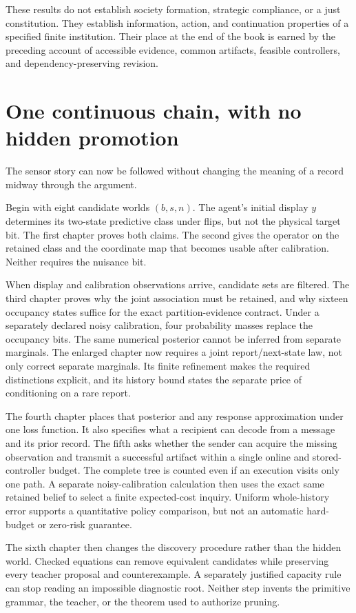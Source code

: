 These results do not establish society formation, strategic compliance, or a just constitution. They establish information, action, and continuation properties of a specified finite institution. Their place at the end of the book is earned by the preceding account of accessible evidence, common artifacts, feasible controllers, and dependency-preserving revision.

\chapter{One continuous chain, with no hidden promotion}\label{ch:close}
The sensor story can now be followed without changing the meaning of a record midway through the argument.

Begin with eight candidate worlds $(b,s,n)$. The agent's initial display $y$ determines its two-state predictive class under flips, but not the physical target bit. The first chapter proves both claims. The second gives the operator on the retained class and the coordinate map that becomes usable after calibration. Neither requires the nuisance bit.

When display and calibration observations arrive, candidate sets are filtered. The third chapter proves why the joint association must be retained, and why sixteen occupancy states suffice for the exact partition-evidence contract. Under a separately declared noisy calibration, four probability masses replace the occupancy bits. The same numerical posterior cannot be inferred from separate marginals. The enlarged chapter now requires a joint report/next-state law, not only correct separate marginals. Its finite refinement makes the required distinctions explicit, and its history bound states the separate price of conditioning on a rare report.

The fourth chapter places that posterior and any response approximation under one loss function. It also specifies what a recipient can decode from a message and its prior record. The fifth asks whether the sender can acquire the missing observation and transmit a successful artifact within a single online and stored-controller budget. The complete tree is counted even if an execution visits only one path. A separate noisy-calibration calculation then uses the exact same retained belief to select a finite expected-cost inquiry. Uniform whole-history error supports a quantitative policy comparison, but not an automatic hard-budget or zero-risk guarantee.

The sixth chapter then changes the discovery procedure rather than the hidden world. Checked equations can remove equivalent candidates while preserving every teacher proposal and counterexample. A separately justified capacity rule can stop reading an impossible diagnostic root. Neither step invents the primitive grammar, the teacher, or the theorem used to authorize pruning.

